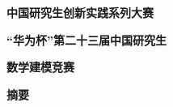 \newif\ifcontest
\contesttrue


\begin{center}
  {\bfseries{}中国研究生创新实践系列大赛\par}
  {\bfseries{}“华为杯”第二十三届中国研究生\par}
  {\bfseries{}数学建模竞赛\par}
  \vspace{.4em}
  \par
  \vspace{.4em}
  {\bfseries{}摘\quad 要\par}
\end{center}
\linespread{1.25}\selectfont
\setlength{\parskip}{5pt}


